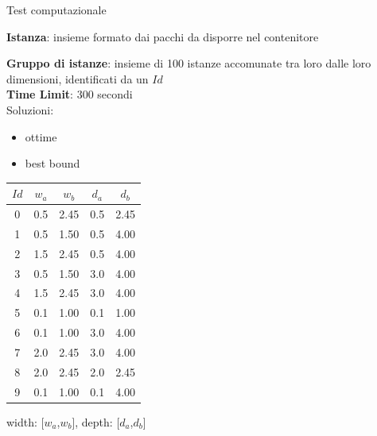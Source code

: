 \documentclass{beamer}
\begin{document}
\begin{frame}{Test computazionale}
	\begin{minipage}[c]{0.45\textwidth}
		\textbf{Istanza}: insieme formato dai pacchi da disporre nel contenitore
		\vspace{.5cm}
												
		\textbf{Gruppo di istanze}: insieme di 100 istanze accomunate tra loro dalle loro dimensioni, identificati da un $Id$\\
												
		\textbf{Time Limit}: 300 secondi\\
												
		Soluzioni:
		\begin{itemize}
			\item ottime
			\item best bound
		\end{itemize}
	\end{minipage}
	\hfill
	\begin{minipage}[c]{0.45\textwidth}
		\begin{center}
			\begin{tabular}{c|c|c|c|c}
				$Id$ & $w_a$ & $w_b$ & $d_a$ & $d_b$ \\
				\hline	
				0    & 0.5   & 2.45  & 0.5   & 2.45  \\
				1    & 0.5   & 1.50  & 0.5   & 4.00  \\
				2    & 1.5   & 2.45  & 0.5   & 4.00  \\
				3    & 0.5   & 1.50  & 3.0   & 4.00  \\
				4    & 1.5   & 2.45  & 3.0   & 4.00  \\
				5    & 0.1   & 1.00  & 0.1   & 1.00  \\
				6    & 0.1   & 1.00  & 3.0   & 4.00  \\
				7    & 2.0   & 2.45  & 3.0   & 4.00  \\
				8    & 2.0   & 2.45  & 2.0   & 2.45  \\
				9    & 0.1   & 1.00  & 0.1   & 4.00  \\
			\end{tabular}
		\end{center}
		width: [$w_a$,$w_b$], depth: [$d_a$,$d_b$]
	\end{minipage}
\end{frame}
\end{document}
